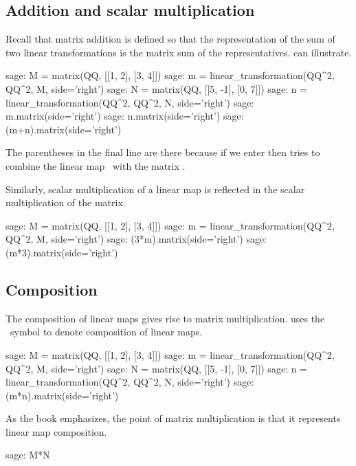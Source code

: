 \subsection{Addition and scalar multiplication}
Recall that matrix addition is defined so that the representation of
the sum of two linear transformations is the matrix sum of the representatives.
\Sage{} can illustrate.
\begin{sagecommandline}
sage: M = matrix(QQ, [[1, 2], [3, 4]])
sage: m = linear_transformation(QQ^2, QQ^2, M, side='right')
sage: N = matrix(QQ, [[5, -1], [0, 7]])
sage: n = linear_transformation(QQ^2, QQ^2, N, side='right')
sage: m.matrix(side='right')
sage: n.matrix(side='right')
sage: (m+n).matrix(side='right')
\end{sagecommandline}
The parentheses in the final line are there because
if we enter  then \Sage{} tries to combine
the linear map~ 
with the matrix .

Similarly, scalar multiplication of a linear map is reflected in 
the scalar multiplication of the matrix.
\begin{sagecommandline}
sage: M = matrix(QQ, [[1, 2], [3, 4]])
sage: m = linear_transformation(QQ^2, QQ^2, M, side='right')
sage: (3*m).matrix(side='right')
sage: (m*3).matrix(side='right')
\end{sagecommandline}



\subsection{Composition}
The composition of linear maps gives rise to matrix multiplication.
\Sage{} uses the \inlinecode{*}~symbol to denote composition of linear maps.
\begin{sagecommandline}
sage: M = matrix(QQ, [[1, 2], [3, 4]])
sage: m = linear_transformation(QQ^2, QQ^2, M, side='right')
sage: N = matrix(QQ, [[5, -1], [0, 7]])
sage: n = linear_transformation(QQ^2, QQ^2, N, side='right')
sage: (m*n).matrix(side='right')
\end{sagecommandline}

As the book emphasizes, the point of matrix multiplication is that it
represents linear map composition.
\begin{sagecommandline}
sage: M*N
\end{sagecommandline}




\endinput


TODO:
